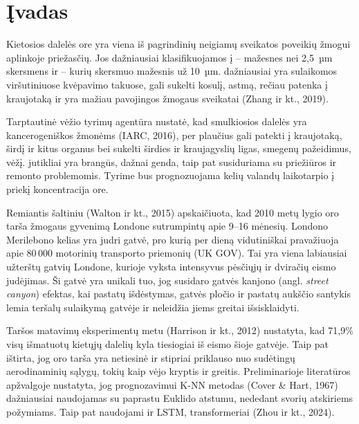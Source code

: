 \documentclass[]{VUMIFTemplateClass}
\begin{document}

    \onehalfspacing
    

    \singlespacing

    \tableofcontents
    \onehalfspacing


    \section*{Įvadas}

    Kietosios dalelės ore yra viena iš pagrindinių neigiamų sveikatos poveikių žmogui aplinkoje priežasčių. Jos dažniausiai klasifikuojamos į  -- mažesnes nei 2{,}5~µm skersmens ir  -- kurių skersmuo mažesnis už 10~µm.  dažniausiai yra sulaikomos viršutiniuose kvėpavimo takuose, gali sukelti kosulį, astmą, rečiau patenka į kraujotaką ir yra mažiau pavojingos žmogaus sveikatai (Zhang ir kt., 2019).

    Tarptautinė vėžio tyrimų agentūra nustatė, kad smulkiosios  dalelės yra kancerogeniškos žmonėms (IARC, 2016), per plaučius gali patekti į kraujotaką, širdį ir kitus organus bei sukelti širdies ir kraujagyslių ligas, smegenų pažeidimus, vėžį.  jutikliai yra brangūs, dažnai genda, taip pat susiduriama su priežiūros ir remonto problemomis. Tyrime bus prognozuojama kelių valandų laikotarpio į priekį  koncentracija ore.

    Remiantis šaltiniu (Walton ir kt., 2015) apskaičiuota, kad 2010 metų lygio oro tarša žmogaus gyvenimą Londone sutrumpintų apie 9--16 mėnesių. Londono Merilebono kelias yra judri gatvė, pro kurią per dieną vidutiniškai pravažiuoja apie 80\,000 motorinių transporto priemonių (UK GOV). Tai yra viena labiausiai užterštų gatvių Londone, kurioje vyksta intensyvus pėsčiųjų ir dviračių eismo judėjimas. Ši gatvė yra unikali tuo, jog susidaro gatvės kanjono (angl. \textit{street canyon}) efektas, kai pastatų išdėstymas, gatvės pločio ir pastatų aukščio santykis lemia teršalų sulaikymą gatvėje ir neleidžia jiems greitai išsisklaidyti.

    Taršos matavimų eksperimentų metu (Harrison ir kt., 2012) nustatyta, kad 71{,}9\% visų išmatuotų kietųjų dalelių kyla tiesiogiai iš eismo šioje gatvėje. Taip pat ištirta, jog oro tarša yra netiesinė ir stipriai priklauso nuo sudėtingų aerodinaminių sąlygų, tokių kaip vėjo kryptis ir greitis. Preliminarioje literatūros apžvalgoje nustatyta, jog  prognozavimui K-NN metodas (Cover \& Hart, 1967) dažniausiai naudojamas su paprastu Euklido atstumu, nededant svorių atskiriems požymiams. Taip pat naudojami ir LSTM, transformeriai (Zhou ir kt., 2024).
\end{document}
